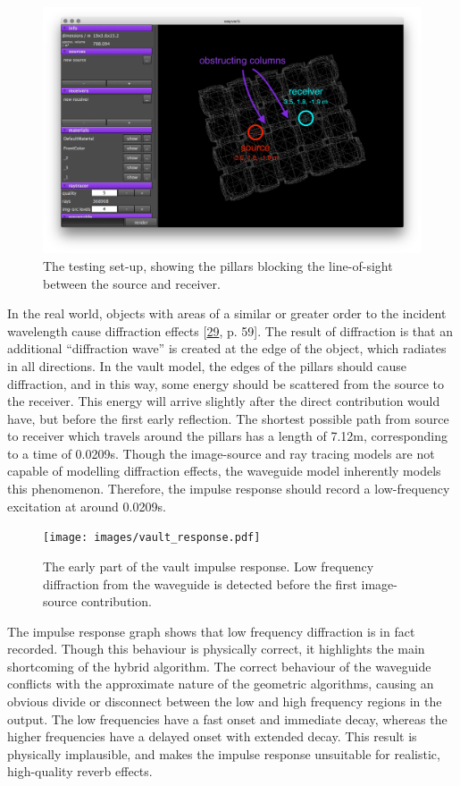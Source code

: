 \documentclass[]{scrreprt}
\begin{document}
\begin{figure}[htbp]
\centering
\includegraphics{images/vault_demo.png}
\caption{The testing set-up, showing the pillars blocking the
line-of-sight between the source and receiver.}
\end{figure}

In the real world, objects with areas of a similar or greater order to
the incident wavelength cause diffraction effects
{[}\protect\hyperlink{ref-kuttruffux5froomux5f2009}{29}, p. 59{]}. The
result of diffraction is that an additional ``diffraction wave'' is
created at the edge of the object, which radiates in all directions. In
the vault model, the edges of the pillars should cause diffraction, and
in this way, some energy should be scattered from the source to the
receiver. This energy will arrive slightly after the direct contribution
would have, but before the first early reflection. The shortest possible
path from source to receiver which travels around the pillars has a
length of 7.12m, corresponding to a time of 0.0209s. Though the
image-source and ray tracing models are not capable of modelling
diffraction effects, the waveguide model inherently models this
phenomenon. Therefore, the impulse response should record a
low-frequency excitation at around 0.0209s.

\begin{figure}[htbp]
\centering
\texttt{[image: images/vault\_response.pdf]}
\caption{The early part of the vault impulse response. Low frequency
diffraction from the waveguide is detected before the first image-source
contribution.\label{fig:vault_response}}
\end{figure}

The impulse response graph 
shows that low frequency diffraction is in fact recorded. Though this
behaviour is physically correct, it highlights the main shortcoming of
the hybrid algorithm. The correct behaviour of the waveguide conflicts
with the approximate nature of the geometric algorithms, causing an
obvious divide or disconnect between the low and high frequency regions
in the output. The low frequencies have a fast onset and immediate
decay, whereas the higher frequencies have a delayed onset with extended
decay. This result is physically implausible, and makes the impulse
response unsuitable for realistic, high-quality reverb effects.
\end{document}
